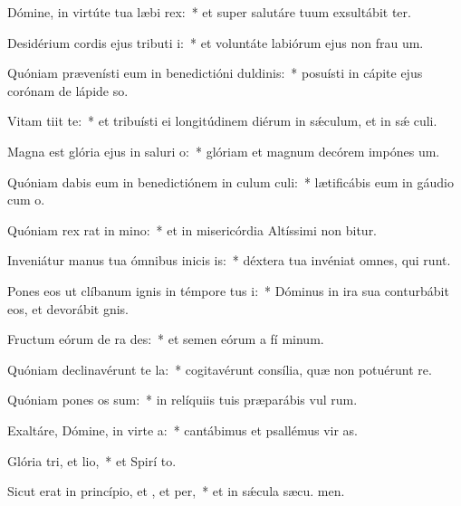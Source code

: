 \item Dómine, in virtúte tua læbi rex:~* et super salutáre tuum exsultábit ter.
\item Desidérium cordis ejus tributi i:~* et voluntáte labiórum ejus non frau um.
\item Quóniam prævenísti eum in benedictióni duldinis:~* posuísti in cápite ejus corónam de lápide so.
\item Vitam tiit  te:~* et tribuísti ei longitúdinem diérum in sǽculum, et in sǽ culi.
\item Magna est glória ejus in saluri o:~* glóriam et magnum decórem impónes  um.
\item Quóniam dabis eum in benedictiónem in culum culi:~* lætificábis eum in gáudio cum  o.
\item Quóniam rex rat in mino:~* et in misericórdia Altíssimi non bitur.
\item Inveniátur manus tua ómnibus inicis is:~* déxtera tua invéniat omnes, qui  runt.
\item Pones eos ut clíbanum ignis in témpore tus i:~* Dóminus in ira sua conturbábit eos, et devorábit  gnis.
\item Fructum eórum de ra des:~* et semen eórum a fí minum.
\item Quóniam declinavérunt  te la:~* cogitavérunt consília, quæ non potuérunt re.
\item Quóniam pones os sum:~* in relíquiis tuis præparábis vul rum.
\item Exaltáre, Dómine, in virte a:~* cantábimus et psallémus vir as.
\item Glória tri, et lio,~* et Spirí to.
\item Sicut erat in princípio, et , et per,~* et in sǽcula sæcu. men.
